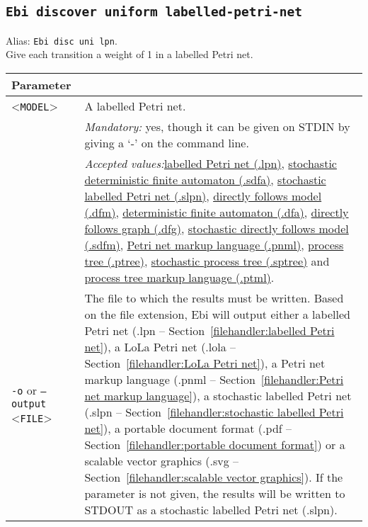 {\subsection{\texttt{Ebi discover uniform labelled-petri-net}}
\label{command:Ebi discover uniform labelled-petri-net}
Alias: \texttt{Ebi disc uni lpn}.\\
Give each transition a weight of 1 in a labelled Petri net.\\
\begin{tabularx}{\linewidth}{lX}
\toprule
Parameter \\\midrule
<\texttt{MODEL}>&A labelled Petri net.\\
&\textit{Mandatory:} \quad yes, though it can be given on STDIN by giving a `-' on the command line.\\
&\textit{Accepted values:}\quad \hyperref[filehandler:labelled Petri net]{labelled Petri net (.lpn)}, \hyperref[filehandler:stochastic deterministic finite automaton]{stochastic deterministic finite automaton (.sdfa)}, \hyperref[filehandler:stochastic labelled Petri net]{stochastic labelled Petri net (.slpn)}, \hyperref[filehandler:directly follows model]{directly follows model (.dfm)}, \hyperref[filehandler:deterministic finite automaton]{deterministic finite automaton (.dfa)}, \hyperref[filehandler:directly follows graph]{directly follows graph (.dfg)}, \hyperref[filehandler:stochastic directly follows model]{stochastic directly follows model (.sdfm)}, \hyperref[filehandler:Petri net markup language]{Petri net markup language (.pnml)}, \hyperref[filehandler:process tree]{process tree (.ptree)}, \hyperref[filehandler:stochastic process tree]{stochastic process tree (.sptree)} and \hyperref[filehandler:process tree markup language]{process tree markup language (.ptml)}.\\
\texttt{-o} or \texttt{--output} <\texttt{FILE}> &
The file to which the results must be written. Based on the file extension, Ebi will output either a labelled Petri net (.lpn -- Section~\ref{filehandler:labelled Petri net}), a LoLa Petri net (.lola -- Section~\ref{filehandler:LoLa Petri net}), a Petri net markup language (.pnml -- Section~\ref{filehandler:Petri net markup language}), a stochastic labelled Petri net (.slpn -- Section~\ref{filehandler:stochastic labelled Petri net}), a portable document format (.pdf -- Section~\ref{filehandler:portable document format}) or a scalable vector graphics (.svg -- Section~\ref{filehandler:scalable vector graphics}).
If the parameter is not given, the results will be written to STDOUT as a stochastic labelled Petri net (.slpn).\\

\end{tabularx}}
